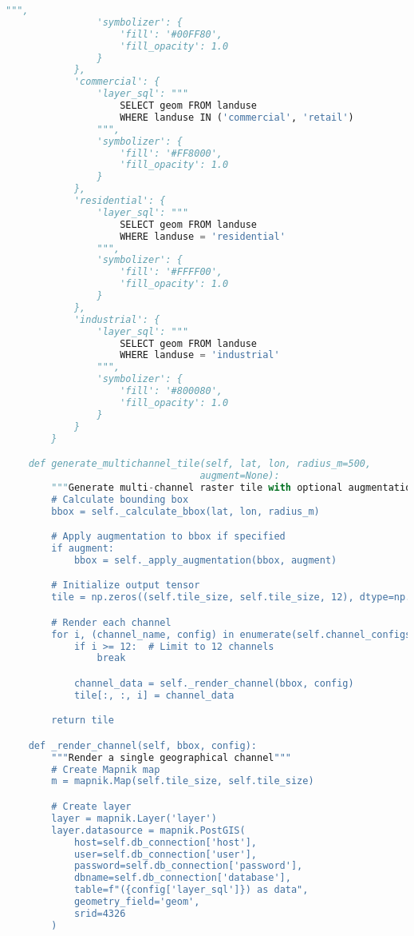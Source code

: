 \begin{lstlisting}[language=Python, caption=Comprehensive Rasterization System]
                """,
                'symbolizer': {
                    'fill': '#00FF80',
                    'fill_opacity': 1.0
                }
            },
            'commercial': {
                'layer_sql': """
                    SELECT geom FROM landuse
                    WHERE landuse IN ('commercial', 'retail')
                """,
                'symbolizer': {
                    'fill': '#FF8000',
                    'fill_opacity': 1.0
                }
            },
            'residential': {
                'layer_sql': """
                    SELECT geom FROM landuse
                    WHERE landuse = 'residential'
                """,
                'symbolizer': {
                    'fill': '#FFFF00',
                    'fill_opacity': 1.0
                }
            },
            'industrial': {
                'layer_sql': """
                    SELECT geom FROM landuse
                    WHERE landuse = 'industrial'
                """,
                'symbolizer': {
                    'fill': '#800080',
                    'fill_opacity': 1.0
                }
            }
        }

    def generate_multichannel_tile(self, lat, lon, radius_m=500,
                                  augment=None):
        """Generate multi-channel raster tile with optional augmentation"""
        # Calculate bounding box
        bbox = self._calculate_bbox(lat, lon, radius_m)

        # Apply augmentation to bbox if specified
        if augment:
            bbox = self._apply_augmentation(bbox, augment)

        # Initialize output tensor
        tile = np.zeros((self.tile_size, self.tile_size, 12), dtype=np.float32)

        # Render each channel
        for i, (channel_name, config) in enumerate(self.channel_configs.items()):
            if i >= 12:  # Limit to 12 channels
                break

            channel_data = self._render_channel(bbox, config)
            tile[:, :, i] = channel_data

        return tile

    def _render_channel(self, bbox, config):
        """Render a single geographical channel"""
        # Create Mapnik map
        m = mapnik.Map(self.tile_size, self.tile_size)

        # Create layer
        layer = mapnik.Layer('layer')
        layer.datasource = mapnik.PostGIS(
            host=self.db_connection['host'],
            user=self.db_connection['user'],
            password=self.db_connection['password'],
            dbname=self.db_connection['database'],
            table=f"({config['layer_sql']}) as data",
            geometry_field='geom',
            srid=4326
        )


\end{lstlisting}
